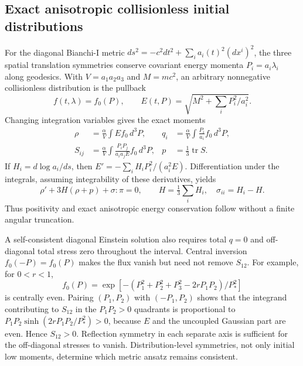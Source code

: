 \subsection{Exact anisotropic collisionless initial distributions}
\label{geo:bianchiI_vlasov}
For the diagonal Bianchi-I metric
$ds^2=-c^2dt^2+\sum_i a_i(t)^2(dx^i)^2$, the three spatial translation symmetries conserve covariant energy momenta $P_i=a_i\lambda_i$ along geodesics. With $V=a_1a_2a_3$ and $M=mc^2$, an arbitrary nonnegative collisionless distribution is the pullback
\begin{equation}
 f(t,\lambda)=f_0(P),\qquad
 E(t,P)=\sqrt{M^2+\sum_iP_i^2/a_i^2}.
 \label{geo:vlasov_pullback}
\end{equation}
Changing integration variables gives the exact moments
\begin{align}
 \rho&=\frac\alpha V\int E f_0\,d^3P,&
 q_i&=\frac\alpha V\int\frac{P_i}{a_i}f_0\,d^3P,\nonumber\\
 S_{ij}&=\frac\alpha V\int\frac{P_iP_j}{a_ia_jE}f_0\,d^3P,&
 p&=\tfrac13\operatorname{tr}S.
 \label{geo:vlasov_exact_moments}
\end{align}
If $H_i=d\log a_i/ds$, then $E'=-\sum_iH_iP_i^2/(a_i^2E)$. Differentiation under the integrals, assuming integrability of these derivatives, yields
\begin{equation}
 \rho'+3H(\rho+p)+\sigma:\pi=0,\qquad
 H=\tfrac13\sum_iH_i,\quad \sigma_{ii}=H_i-H.
 \label{geo:vlasov_energy}
\end{equation}
Thus positivity and exact anisotropic energy conservation follow without a finite angular truncation.

A self-consistent diagonal Einstein solution also requires total $q=0$ and off-diagonal total stress zero throughout the interval. Central inversion $f_0(-P)=f_0(P)$ makes the flux vanish but need not remove $S_{12}$. For example, for $0<r<1$,
\begin{equation}
 f_0(P)=\exp[-(P_1^2+P_2^2+P_3^2-2rP_1P_2)/P_*^2]
 \label{geo:correlated_gaussian}
\end{equation}
is centrally even. Pairing $(P_1,P_2)$ with $(-P_1,P_2)$ shows that the integrand contributing to $S_{12}$ in the $P_1P_2>0$ quadrants is proportional to
$P_1P_2\sinh(2rP_1P_2/P_*^2)>0$, because $E$ and the uncoupled Gaussian part are even. Hence $S_{12}>0$. Reflection symmetry in each separate axis is sufficient for the off-diagonal stresses to vanish. Distribution-level symmetries, not only initial low moments, determine which metric ansatz remains consistent.

